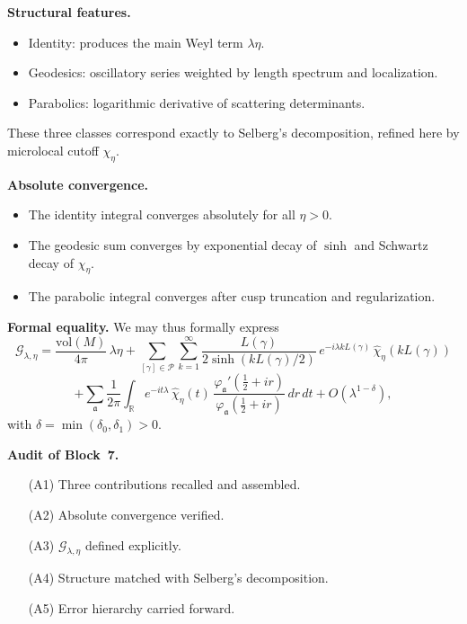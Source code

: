 \medskip

\noindent\textbf{Structural features.}
\begin{itemize}
  \item Identity: produces the main Weyl term $\lambda\eta$.
  \item Geodesics: oscillatory series weighted by length spectrum and localization.
  \item Parabolics: logarithmic derivative of scattering determinants.
\end{itemize}
These three classes correspond exactly to Selberg’s decomposition,  
refined here by microlocal cutoff $\chi_\eta$.

\medskip

\noindent\textbf{Absolute convergence.}
\begin{itemize}
  \item The identity integral converges absolutely for all $\eta>0$.
  \item The geodesic sum converges by exponential decay of $\sinh$ and Schwartz decay of $\widehat{\chi}_\eta$.
  \item The parabolic integral converges after cusp truncation and regularization.
\end{itemize}

\medskip

\noindent\textbf{Formal equality.}
We may thus formally express
\[
  \mathcal{G}_{\lambda,\eta}
  = \frac{\mathrm{vol}(M)}{4\pi}\, \lambda \eta
  + \sum_{[\gamma]\in \mathcal{P}} \sum_{k=1}^\infty
    \frac{L(\gamma)}{2\sinh(kL(\gamma)/2)}\,
    e^{-i\lambda kL(\gamma)}\, \widehat{\chi}_\eta(kL(\gamma))
\]
\[
  + \sum_{\mathfrak{a}} \frac{1}{2\pi}\int_{\mathbb{R}}
    e^{-it\lambda}\,\widehat{\chi}_\eta(t)\,
    \frac{\varphi_\mathfrak{a}'(\tfrac12+ir)}{\varphi_\mathfrak{a}(\tfrac12+ir)}\, dr\, dt
  + O(\lambda^{1-\delta}),
\]
with $\delta=\min(\delta_0,\delta_1)>0$.

\medskip

\noindent\textbf{Audit of Block~7.}
\begin{itemize}
  \item[(A1)] Three contributions recalled and assembled.  
  \item[(A2)] Absolute convergence verified.  
  \item[(A3)] $\mathcal{G}_{\lambda,\eta}$ defined explicitly.  
  \item[(A4)] Structure matched with Selberg’s decomposition.  
  \item[(A5)] Error hierarchy carried forward.  
\end{itemize}

